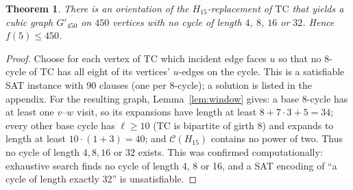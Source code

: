 \documentclass[10pt,a4paper]{amsart}
\newtheorem{theorem}{Theorem}
\newcommand{\Cyc}{\mathcal{C}}
\newcommand{\TC}{\mathrm{TC}}
\begin{document}
\begin{theorem}\label{thm:450}
There is an orientation of the $H_{15}$-replacement of $\TC$ that yields a cubic graph $G'_{450}$ on $450$ vertices with no cycle of length $4$, $8$, $16$ or $32$. Hence $f(5)\le 450$.
\end{theorem}

\begin{proof}
Choose for each vertex of $\TC$ which incident edge faces $u$ so that no 8-cycle of $\TC$ has all eight of its vertices' $u$-edges on the cycle. This is a satisfiable SAT instance with 90 clauses (one per 8-cycle); a solution is listed in the appendix. For the resulting graph, Lemma~\ref{lem:window} gives: a base 8-cycle has at least one $v$--$w$ visit, so its expansions have length at least $8+7\cdot 3+5=34$; every other base cycle has $\ell\ge 10$ ($\TC$ is bipartite of girth 8) and expands to length at least $10\cdot(1+3)=40$; and $\Cyc(H_{15})$ contains no power of two. Thus no cycle of length $4,8,16$ or $32$ exists. This was confirmed computationally: exhaustive search finds no cycle of length 4, 8 or 16, and a SAT encoding of ``a cycle of length exactly 32'' is unsatisfiable.
\end{proof}
\end{document}
